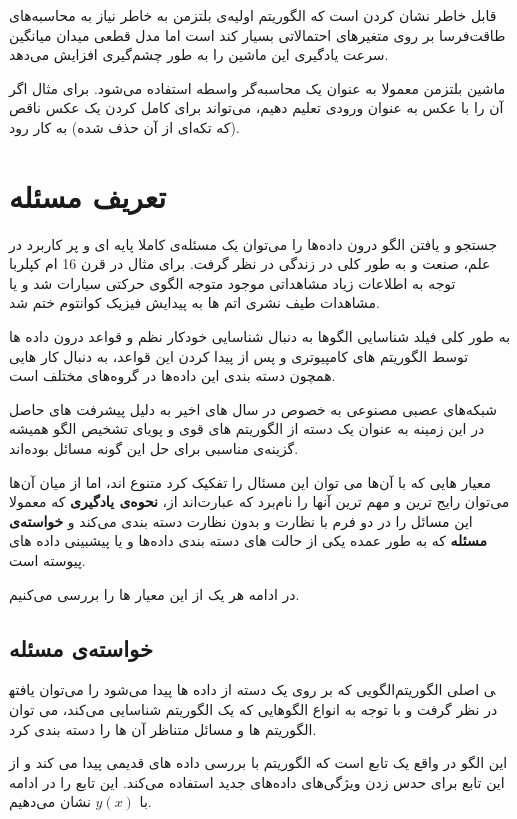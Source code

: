 \documentclass[11pt,a4paper,twocolumn]{article}
\begin{document}
قابل خاطر نشان کردن است که الگوریتم اولیه‌ی بلتزمن به خاطر نیاز به محاسبه‌های طاقت‌فرسا بر روی متغیرهای احتمالاتی بسیار کند است اما مدل قطعی
میدان میانگین
سرعت یادگیری این ماشین را به طور چشم‌گیری افزایش می‌دهد.\cite[ص-۱۶۳]{hertz}

ماشین بلتزمن معمولا به عنوان یک محاسبه‌گر واسطه استفاده می‌شود. برای مثال اگر آن را با عکس به عنوان ورودی تعلیم دهیم، می‌تواند برای کامل کردن یک عکس ناقص (که تکه‌ای از آن حذف شده) به کار رود.
\section{تعریف مسئله}
جستجو و یافتن الگو درون داده‌ها را می‌توان یک مسئله‌ی کاملا پایه ای و پر کاربرد در علم، صنعت و به طور کلی در زندگی در نظر گرفت. برای مثال در قرن 16 ام کپلربا توجه به اطلاعات زیاد مشاهداتی موجود متوجه الگوی حرکتی سیارات ‌شد و یا مشاهدات طیف نشری اتم ها به پیدایش فیزیک کوانتوم ختم شد.

به طور کلی فیلد شناسایی الگوها به دنبال شناسایی خودکار نظم و قواعد درون داده ها توسط الگوریتم های کامپیوتری و پس از پیدا کردن این قواعد، به دنبال کار هایی همچون دسته بندی این داده‌ها در گروه‌های مختلف است.
\cite[ص-۱]{bishop}

شبکه‌های عصبی مصنوعی به خصوص در سال های اخیر به دلیل پیشرفت های حاصل در این زمینه  به عنوان یک دسته از الگوریتم های قوی و پویای تشخیص الگو همیشه گزینه‌ی مناسبی برای حل این گونه مسائل بوده‌اند.

معیار هایی که با آن‌ها می توان این مسئال را تفکیک کرد متنوع اند، اما از میان آن‌ها می‌توان رایج ترین و مهم ترین آنها را نام‌برد که عبارت‌اند از، \textbf{نحوه‌ی یادگیری} که معمولا این مسائل را در دو فرم با نظارت و بدون نظارت دسته بندی می‌کند و \textbf{خواسته‌ی مسئله} که به طور عمده یکی از حالت های دسته بندی داده‌ها و یا پیشبینی داده های پیوسته است.

در ادامه هر یک از این معیار ها را بررسی می‌کنیم.
\subsection{خواسته‌ی مسئله}
الگویی که بر روی یک دسته از داده ها پیدا می‌شود را می‌توان یافته‎ی اصلی الگوریتم در نظر گرفت و با توجه به انواع الگوهایی که یک الگوریتم شناسایی می‌کند، می توان الگوریتم ها و مسائل متناظر آن ها را دسته بندی کرد.

این الگو در واقع یک تابع است که الگوریتم با بررسی داده های قدیمی پیدا می کند و از این تابع برای حدس زدن ویژگی‌های داده‌های جدید استفاده می‌کند. این تابع را در ادامه با $y(x)$ نشان می‌دهیم.
\end{document}
